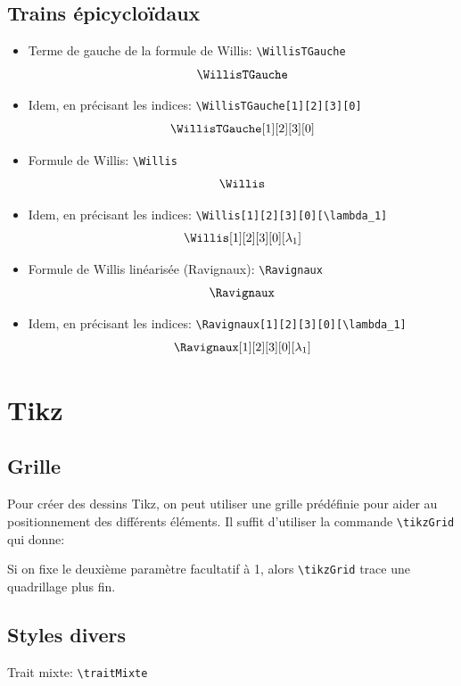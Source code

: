 \documentclass[11pt]{ltxdockit}[2010/09/26]
\begin{document}
\subsection{Trains épicycloïdaux}
\begin{itemize}
\item Terme \og{}de gauche\fg{} de la formule de Willis: \verb!\WillisTGauche!
\[ \WillisTGauche \]
\item Idem, en précisant les indices: \verb!\WillisTGauche[1][2][3][0]!
\[ \WillisTGauche[1][2][3][0] \]
\item Formule de Willis: \verb!\Willis!
\[ \Willis \]
\item Idem, en précisant les indices: \verb!\Willis[1][2][3][0][\lambda_1]!
\[ \Willis[1][2][3][0][\lambda_1] \]
\item Formule de Willis linéarisée (Ravignaux): \verb!\Ravignaux!
\[ \Ravignaux \]
\item Idem, en précisant les indices: \verb!\Ravignaux[1][2][3][0][\lambda_1]!
\[ \Ravignaux [1][2][3][0][\lambda_1] \]
\end{itemize}

\section{Tikz}
\subsection{Grille}
Pour créer des dessins Tikz, on peut utiliser une grille prédéfinie pour aider au positionnement des différents éléments. Il suffit d'utiliser la commande \verb!\tikzGrid! qui donne:

\begin{center}
\end{center}

Si on fixe le deuxième paramètre facultatif à 1, alors \verb!\tikzGrid! trace une quadrillage plus fin.

\subsection{Styles divers}
\noindent Trait mixte: \verb!\traitMixte!
\end{document}
